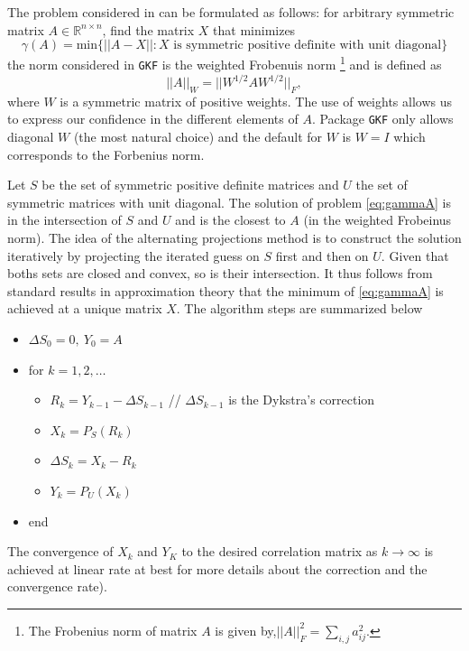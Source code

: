 \documentclass{article}
\newcommand{\GKF}{\texttt{GKF}\xspace}
\begin{document}
The problem considered in \citet{higham2002computing} can be formulated as follows: for
arbitrary symmetric matrix $A \in \mathbb{R}^{n \times n}$, find the matrix $X$ that
minimizes
\begin{equation}
 \gamma(A)
 = \text{min} \big\{ ||A-X ||: X \text{ is symmetric positive definite with unit diagonal} \big\}
 \label{eq:gammaA}
\end{equation}
the norm considered in \GKF is the weighted Frobenuis norm \footnote{The Frobenius norm of
  matrix $A$ is given by,$ ||A||_F^2=\sum_{i,j} a_{ij}^2 $.} and is defined as
\begin{equation*}
  ||A||_W = ||W^{1/2}A W^{1/2} ||_F
  ,
\end{equation*}
where $W$ is a symmetric matrix of positive weights. The use of weights allows us to express
our confidence in the different elements of $A$. Package \GKF only allows diagonal $W$ (the
most natural choice) and the default for $W$ is $W=I$ which corresponds to the Forbenius
norm.

Let $S$ be the set of symmetric positive definite matrices and $U$ the set of symmetric
matrices with unit diagonal.  The solution of problem \eqref{eq:gammaA} is in the
intersection of $S$ and $U$ and is the closest to $A$ (in the weighted Frobeinus norm).  The
idea of the alternating projections method is to construct the solution iteratively by
projecting the iterated guess on $S$ first and then on $U$. Given that boths sets are closed
and convex, so is their intersection. It thus follows from standard results in approximation
theory that the minimum of \eqref{eq:gammaA} is achieved at a unique matrix $X$. The
algorithm steps are summarized below
\begin{itemize}
  \item $\Delta S_0=0, \  Y_0=A $
  \item for $k=1,2,\dots $
    \begin{itemize}
    \item $R_k=Y_{k-1} - \Delta S_{k-1}$ // $\Delta S_{k-1}$ is the Dykstra's correction
    \item $X_k= P_S(R_k)$
    \item $\Delta S_k= X_k - R_k$
    \item $Y_k = P_U(X_k)$
    \end{itemize}
  \item end
\end{itemize}
The convergence of $X_k$ and $Y_K$ to the desired correlation matrix as
$k \rightarrow \infty$ is achieved at linear rate at best \citep[see ]{boyle1986method} for
more details about the correction and the convergence rate).
\end{document}
